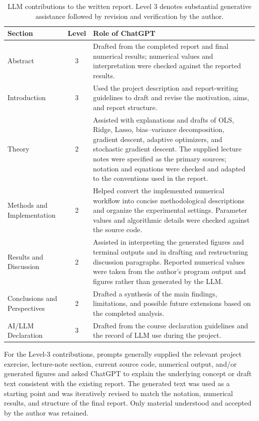 \documentclass[aps,rmp,reprint,amsmath,amssymb,graphicx,longbibliography]{revtex4-1}
\begin{document}
\begin{table}[t]
\centering
\caption{LLM contributions to the written report. Level 3 denotes substantial
generative assistance followed by revision and verification by the author.}
\begin{tabular}{p{}cp{}}
\hline
Section & Level & Role of ChatGPT \\
\hline
Abstract & 3 &
Drafted from the completed report and final numerical results; numerical
values and interpretation were checked against the reported results. \\

Introduction & 3 &
Used the project description and report-writing guidelines to draft and
revise the motivation, aims, and report structure. \\

Theory & 2 &
Assisted with explanations and drafts of OLS, Ridge, Lasso, bias--variance
decomposition, gradient descent, adaptive optimizers, and stochastic gradient
descent. The supplied lecture notes were specified as the primary sources;
notation and equations were checked and adapted to the conventions used in
the report. \\

Methods and Implementation & 2 &
Helped convert the implemented numerical workflow into concise methodological
descriptions and organize the experimental settings. Parameter values and
algorithmic details were checked against the source code. \\

Results and Discussion & 2 &
Assisted in interpreting the generated figures and terminal outputs and in
drafting and restructuring discussion paragraphs. Reported numerical values
were taken from the author's program output and figures rather than generated
by the LLM. \\

Conclusions and Perspectives & 2 &
Drafted a synthesis of the main findings, limitations, and possible future
extensions based on the completed analysis. \\

AI/LLM Declaration & 3 &
Drafted from the course declaration guidelines and the record of LLM use
during the project. \\
\hline
\end{tabular}
\end{table}

For the Level-3 contributions, prompts generally supplied the relevant project
exercise, lecture-note section, current source code, numerical output, and/or
generated figures and asked ChatGPT to explain the underlying concept or draft
text consistent with the existing report. The generated text was used as a
starting point and was iteratively revised to match the notation, numerical
results, and structure of the final report. Only material understood and
accepted by the author was retained.
\end{document}
